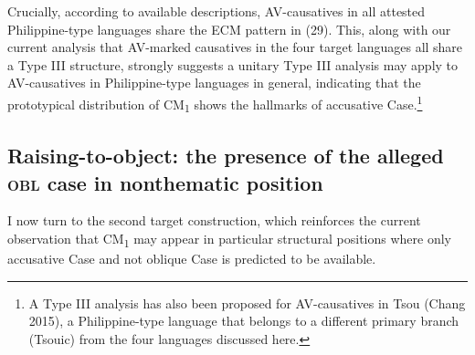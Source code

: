 \documentclass[10pt]{article}
\begin{document}
 \begin{exe}
 \newline
 \end{exe}
\bigskip


Crucially, according to available descriptions, AV-causatives in all attested Philippine-type languages share the ECM pattern in (29). This, along with our current analysis that AV-marked causatives in the four target languages all share a Type III structure, strongly suggests a unitary Type III analysis may apply to AV-causatives in Philippine-type languages in general, indicating that the prototypical distribution of CM\textsubscript{1} shows the hallmarks of accusative Case.\bigskip\footnote{A Type III analysis has also been proposed for AV-causatives in Tsou (Chang 2015), a Philippine-type language that belongs to a different primary branch (Tsouic) from the four languages discussed here.}


\subsection{Raising-to-object: the presence of the alleged \textsc{obl} case in nonthematic position}

\noindent I now turn to the second  target construction, which reinforces the current observation that CM\textsubscript{1} may appear in particular structural positions where only  accusative Case and not oblique Case is predicted to be available. 
\end{document}
